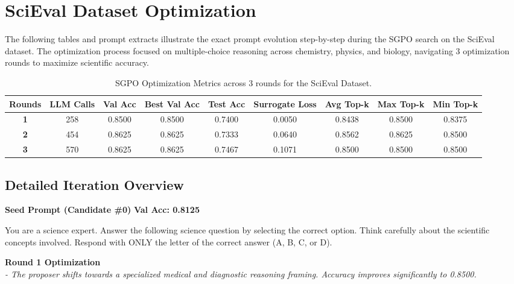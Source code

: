\section{SciEval Dataset Optimization}

The following tables and prompt extracts illustrate the exact prompt evolution step-by-step during the SGPO search on the SciEval dataset. The optimization process focused on multiple-choice reasoning across chemistry, physics, and biology, navigating 3 optimization rounds to maximize scientific accuracy.

\begin{table}[htbp]
    \centering
    \begin{tabular}{ccccccccc}
    \toprule
    \textbf{Rounds} & \textbf{LLM Calls} & \textbf{Val Acc} & \textbf{Best Val Acc} & \textbf{Test Acc} & \textbf{Surrogate Loss} & \textbf{Avg Top-k} & \textbf{Max Top-k} & \textbf{Min Top-k} \\
    \midrule
    \textbf{1} & 258 & 0.8500 & 0.8500 & 0.7400 & 0.0050 & 0.8438 & 0.8500 & 0.8375 \\
    \textbf{2} & 454 & 0.8625 & 0.8625 & 0.7333 & 0.0640 & 0.8562 & 0.8625 & 0.8500 \\
    \textbf{3} & 570 & 0.8625 & 0.8625 & 0.7467 & 0.1071 & 0.8500 & 0.8500 & 0.8500 \\
    \bottomrule
    \end{tabular}
    \caption{SGPO Optimization Metrics across 3 rounds for the SciEval Dataset.}
    \label{tab:scieval_metrics}
\end{table}

\subsection*{Detailed Iteration Overview}

\begin{roundbox}
\textbf{Seed Prompt (Candidate \#0)} \hfill \textbf{Val Acc: 0.8125}
\end{roundbox}

\begin{prompttext}
You are a science expert. Answer the following science question by selecting the correct option. Think carefully about the scientific concepts involved. Respond with ONLY the letter of the correct answer (A, B, C, or D).
\end{prompttext}

\vspace{1em}
\noindent \textbf{Round 1 Optimization} \\
\textit{- The proposer shifts towards a specialized medical and diagnostic reasoning framing. Accuracy improves significantly to 0.8500.}

